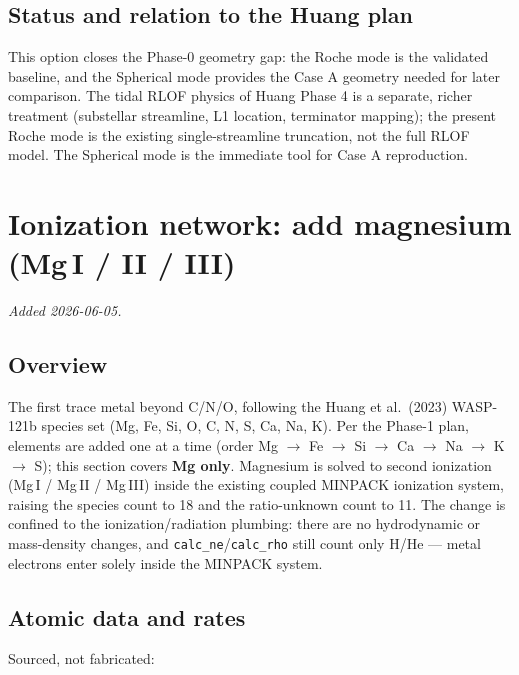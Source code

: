 \documentclass[english,a4paper]{kiseon_memo}
\begin{document}
\subsection{Status and relation to the Huang plan}

This option closes the Phase-0 geometry gap: the Roche mode is the validated
baseline, and the Spherical mode provides the Case A geometry needed for later
comparison. The tidal RLOF physics of Huang Phase 4 is a separate, richer
treatment (substellar streamline, L1 location, terminator mapping); the present
Roche mode is the existing single-streamline truncation, not the full RLOF
model. The Spherical mode is the immediate tool for Case A reproduction.

\section{Ionization network: add magnesium (Mg\,I / II / III)}
\textit{Added 2026-06-05.}

\subsection{Overview}

The first trace metal beyond C/N/O, following the Huang et al.\ (2023)
WASP-121b species set (Mg, Fe, Si, O, C, N, S, Ca, Na, K). Per the Phase-1 plan,
elements are added one at a time (order Mg $\to$ Fe $\to$ Si $\to$ Ca $\to$ Na
$\to$ K $\to$ S); this section covers \textbf{Mg only}. Magnesium is solved to
second ionization (Mg\,I / Mg\,II / Mg\,III) inside the existing coupled MINPACK
ionization system, raising the species count to 18 and the ratio-unknown count
to 11. The change is confined to the ionization/radiation plumbing: there are no
hydrodynamic or mass-density changes, and \verb|calc_ne|/\verb|calc_rho| still
count only H/He --- metal electrons enter solely inside the MINPACK system.

\subsection{Atomic data and rates}

Sourced, not fabricated:
\end{document}
